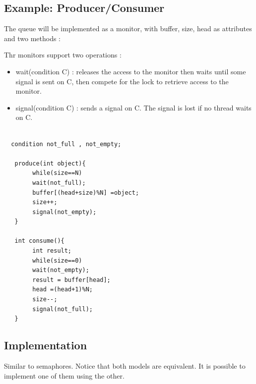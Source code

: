 \subsection{Example: Producer/Consumer}

The queue will be implemented as a monitor, with buffer, size, head as attributes and two methods :

Thr monitors support two operations :
\begin{itemize}
  \item wait(condition C) : releases the access to the monitor then waits until some signal is sent on C, then compete for the lock to retrieve access to the monitor.
  \item signal(condition C) : sends a signal on C. The signal is lost if no thread waits on C.
\end{itemize}
 
 
 \begin{verbatim}
 
  condition not_full , not_empty;
  
   produce(int object){
        while(size==N)
        wait(not_full);
        buffer[(head+size)%N] =object;
        size++;
        signal(not_empty);
   }
   
   int consume(){
        int result;
        while(size==0)
        wait(not_empty);
        result = buffer[head];
        head =(head+1)%N;
        size--;
        signal(not_full);
   }
 \end{verbatim}


\subsection{Implementation}

Similar to semaphores. Notice that both models are equivalent. It is possible to implement one of them using the other.
